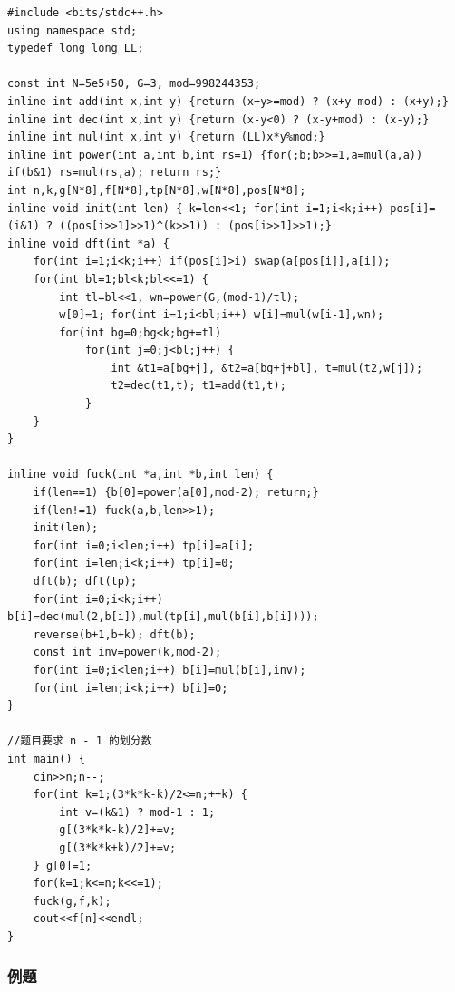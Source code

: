 \begin{lstlisting}
#include <bits/stdc++.h>
using namespace std;
typedef long long LL;

const int N=5e5+50, G=3, mod=998244353;
inline int add(int x,int y) {return (x+y>=mod) ? (x+y-mod) : (x+y);}
inline int dec(int x,int y) {return (x-y<0) ? (x-y+mod) : (x-y);}
inline int mul(int x,int y) {return (LL)x*y%mod;}
inline int power(int a,int b,int rs=1) {for(;b;b>>=1,a=mul(a,a)) if(b&1) rs=mul(rs,a); return rs;}
int n,k,g[N*8],f[N*8],tp[N*8],w[N*8],pos[N*8];
inline void init(int len) {	k=len<<1; for(int i=1;i<k;i++) pos[i]=(i&1) ? ((pos[i>>1]>>1)^(k>>1)) : (pos[i>>1]>>1);}
inline void dft(int *a) {
    for(int i=1;i<k;i++) if(pos[i]>i) swap(a[pos[i]],a[i]);
    for(int bl=1;bl<k;bl<<=1) {
        int tl=bl<<1, wn=power(G,(mod-1)/tl);
        w[0]=1; for(int i=1;i<bl;i++) w[i]=mul(w[i-1],wn);
        for(int bg=0;bg<k;bg+=tl)
            for(int j=0;j<bl;j++) {
                int &t1=a[bg+j], &t2=a[bg+j+bl], t=mul(t2,w[j]);
                t2=dec(t1,t); t1=add(t1,t);
            }
    }
}

inline void fuck(int *a,int *b,int len) {
    if(len==1) {b[0]=power(a[0],mod-2); return;}
    if(len!=1) fuck(a,b,len>>1);
    init(len);
    for(int i=0;i<len;i++) tp[i]=a[i];
    for(int i=len;i<k;i++) tp[i]=0;
    dft(b); dft(tp);
    for(int i=0;i<k;i++) b[i]=dec(mul(2,b[i]),mul(tp[i],mul(b[i],b[i])));
    reverse(b+1,b+k); dft(b);
    const int inv=power(k,mod-2);
    for(int i=0;i<len;i++) b[i]=mul(b[i],inv);
    for(int i=len;i<k;i++) b[i]=0;
}

//题目要求 n - 1 的划分数
int main() {
    cin>>n;n--;
    for(int k=1;(3*k*k-k)/2<=n;++k) {
        int v=(k&1) ? mod-1 : 1;
        g[(3*k*k-k)/2]+=v;
        g[(3*k*k+k)/2]+=v;
    } g[0]=1;
    for(k=1;k<=n;k<<=1);
   	fuck(g,f,k);
    cout<<f[n]<<endl;
}
\end{lstlisting}

\subsubsection{例题}

